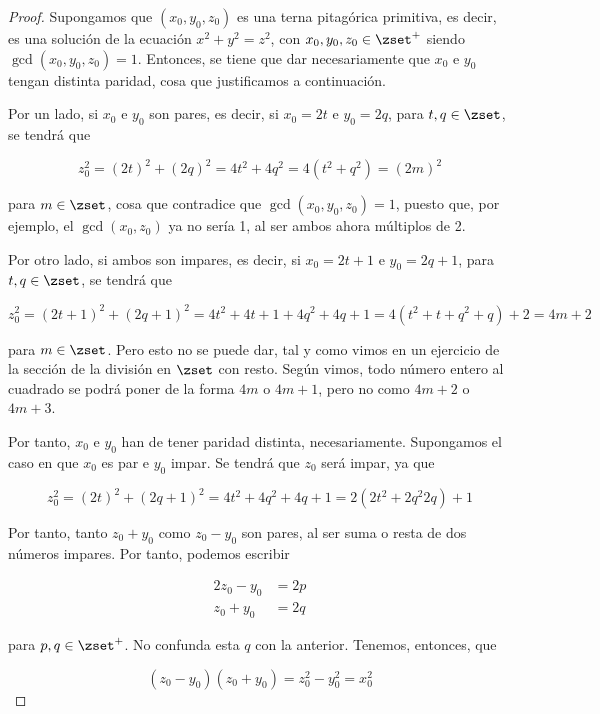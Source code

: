 \begin{proof}
  Supongamos que $(x_0, y_0, z_0)$ es una terna pitagórica primitiva, es
  decir, es una solución de la ecuación $x^2 + y^2 = z^2$, con $x_0, y_0,
  z_0 \in \zset^{+}$ siendo $\gcd(x_0, y_0, z_0) = 1$. Entonces, se tiene
  que dar necesariamente que $x_0$ e $y_0$ tengan distinta paridad, cosa que
  justificamos a continuación.

  Por un lado, si $x_0$ e $y_0$ son pares, es decir, si $x_0 = 2t$ e $y_0 =
  2q$, para $t, q \in \zset$, se tendrá que

  $$ z_0^2 = (2t)^2 + (2q)^2 = 4t^2 + 4q^2 = 4(t^2 + q^2) = (2m)^2 $$

  \noindent para $m \in \zset$, cosa que contradice que $\gcd(x_0, y_0, z_0)
  = 1$, puesto que, por ejemplo, el $\gcd(x_0, z_0)$ ya no sería 1, al ser
  ambos ahora múltiplos de 2.

  Por otro lado, si ambos son impares, es decir, si $x_0 = 2t + 1$ e $y_0 =
  2q + 1$, para $t, q \in \zset$, se tendrá que

  $$ z_0^2 = (2t + 1)^2 + (2q + 1)^2 = 4t^2 + 4t + 1 + 4q^2 + 4q + 1 = 4(t^2
  + t + q^2 + q) + 2 = 4m + 2 $$

  \noindent para $m \in \zset$. Pero esto no se puede dar, tal y como vimos
  en un ejercicio de la sección de la división en $\zset$ con resto. Según
  vimos, todo número entero al cuadrado se podrá poner de la forma $4m$ o
  $4m + 1$, pero no como $4m + 2$ o $4m + 3$.

  Por tanto, $x_0$ e $y_0$ han de tener paridad distinta, necesariamente.
  Supongamos el caso en que $x_0$ es par e $y_0$ impar. Se tendrá que $z_0$
  será impar, ya que


  $$ z_0^2 = (2t)^2 + (2q + 1)^2 = 4t^2 + 4q^2 + 4q + 1 = 2(2t^2 + 2q^2 2q)
  + 1 $$

  Por tanto, tanto $z_0 + y_0$ como $z_0 - y_0$ son pares, al ser suma o
  resta de dos números impares. Por tanto, podemos escribir

  \begin{alignat*}{2}
    z_0 - y_0   &= 2p \\
    z_0 + y_0   &= 2q
  \end{alignat*}

  \noindent para $p, q \in \zset^{+}$. No confunda esta $q$ con la anterior.
  Tenemos, entonces, que

  $$ (z_0 - y_0)(z_0 + y_0) = z_0^2 - y_0^2 = x_0^2  $$


\end{proof}
